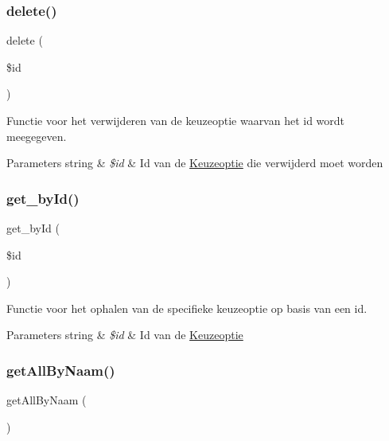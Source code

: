 \subsubsection{\texorpdfstring{delete()}{delete()}}
{\footnotesize\ttfamily delete (\begin{DoxyParamCaption}\item[{}]{\$id }\end{DoxyParamCaption})}

Functie voor het verwijderen van de keuzeoptie waarvan het id wordt meegegeven. 
\begin{DoxyParams}[1]{Parameters}
string & {\em \$id} & Id van de \mbox{\hyperlink{class_keuzeoptie}{Keuzeoptie}} die verwijderd moet worden \\
\hline
\end{DoxyParams}
\mbox{\label{class_keuzeoptie___model_a98d28a4d9a29d40c5a8aa0176f19a919}} 
\subsubsection{\texorpdfstring{get\+\_\+by\+Id()}{get\_byId()}}
{\footnotesize\ttfamily get\+\_\+by\+Id (\begin{DoxyParamCaption}\item[{}]{\$id }\end{DoxyParamCaption})}

Functie voor het ophalen van de specifieke keuzeoptie op basis van een id. 
\begin{DoxyParams}[1]{Parameters}
string & {\em \$id} & Id van de \mbox{\hyperlink{class_keuzeoptie}{Keuzeoptie}} \\
\hline
\end{DoxyParams}
\mbox{\label{class_keuzeoptie___model_a2b035b1ffd1cbe651b35bb3e53d72c09}} 
\subsubsection{\texorpdfstring{get\+All\+By\+Naam()}{getAllByNaam()}}
{\footnotesize\ttfamily get\+All\+By\+Naam (\begin{DoxyParamCaption}{ }\end{DoxyParamCaption})}

